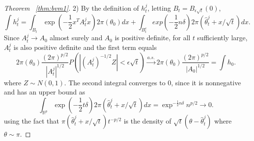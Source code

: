 \documentclass[twoside,11pt]{article}
\numberwithin{equation}{section}
\newcommand{\R}{{\mathbb{R}}}
\newcommand\bP{\mathbb{P}}
\newcommand{\asto}{\stackrel{a.s.}{\to}}
\begin{document}
{\begin{proof}[Theorem ~\ref{thm:bvm1}]
2) By the definition of $h_t^j$, letting $B_t = B_{\epsilon \sqrt{t}}(0)$, 
\begin{equation*}
    \int h_t^j = \int_{B_t} \exp(-\frac{1}{2} x^T A_t^j x) 2 \pi(\theta_0) dx + \int_{B_t^c}exp(-\frac{1}{2} n \delta) 2\pi(\hat\theta_t^j + x/\sqrt{t}) dx. 
\end{equation*}
Since $A_t^j \to A_0$ almost surely and $A_0$ is positive definite, for all $t$ sufficiently large, $A_t^j$ is also positive definite and the first term equals 
\begin{equation*}
    2\pi(\theta_0) \frac{(2\pi)^{p/2}}{|A_t^j|^{1/2}} P(|(A_t^j)^{-1/2}Z | < \epsilon \sqrt{t}) \asto   2\pi(\theta_0) \frac{(2\pi)^{p/2}}{|A_0|^{1/2}} = \int h_0 . 
\end{equation*}
where $Z \sim N(0,1)$. The second integral converges to $0$, since it is nonnegative and has an upper bound as 
\begin{equation*}
  \int_{\R^p}\exp(-\frac{1}{2} t \delta) 2\pi(\hat\theta_t^j + x/\sqrt{t}) dx = \exp^{-\frac{1}{2} n \delta} n^{p/2} \to 0. 
\end{equation*}
using the fact that $\pi(\hat\theta_t^j+ x/\sqrt{t}) t^{-p/2}$ is the density of $\sqrt{t}(\theta -\hat \theta_t^j)$ where $\theta \sim \pi$. 
 

\end{proof}}
\end{document}
